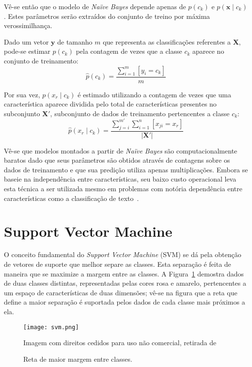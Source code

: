 Vê-se então que o modelo de \textit{Naïve Bayes} depende apenas de $p(c_k)$ e $p(\mathbf{x} \mid c_k)$.
Estes parâmetros serão extraídos do conjunto de treino por máxima verossimilhança.

Dado um vetor $\mathbf{y}$ de tamanho $m$ que representa as classificações referentes a $\mathbf{X}$, pode-se estimar
$p(c_k)$ pela contagem de vezes que a classe $c_k$ aparece no conjunto de treinamento:
\begin{equation}
    \hat{p}(c_k) = \frac{\sum_{i=1}^m [y_i = c_k]}{m}
\end{equation}

Por sua vez, $p(x_r \mid c_k)$ é estimado utilizando a contagem de vezes que uma característica aparece dividida pelo
total de características presentes no subconjunto $\mathbf{X'}$, subconjunto de dados de treinamento pertencentes a
classe $c_k$:
\begin{equation}
    \hat{p}(x_r \mid c_k) = \frac{\sum_{j=i}^{m'} \sum_{i=1}^n [x_{ji} = x_r]}{|\mathbf{X'}|}
\end{equation}

Vê-se que modelos montados a partir de \textit{Naïve Bayes} são computacionalmente baratos dado que seus parâmetros são
obtidos através de contagens sobre os dados de treinamento e que sua predição utiliza apenas multiplicações.
Embora se baseie na independência entre características, seu baixo custo operacional leva esta técnica a ser utilizada
mesmo em problemas com notória dependência entre características como a classificação de texto~\cite{mccallum98}.

\section{Support Vector Machine}

O conceito fundamental do \textit{Support Vector Machine} (SVM) se dá pela obtenção de vetores de suporte que melhor
separe as classes.
Esta separação é feita de maneira que se maximize a margem entre as classes.
A Figura~\ref{fig:svm} demostra dados de duas classes distintas, representadas pelas cores rosa e amarelo, pertencentes
a um espaço de características de duas dimensões; vê-se na figura que a reta que define a maior separação é suportada
pelos dados de cada classe mais próximos a ela.

\begin{figure}
\begin{center} {
    \begin{center}
    \texttt{[image: svm.png]}
    \caption{Reta de maior margem entre classes.}
    \small Imagem com direitos cedidos para uso não comercial, retirada de~\cite{vanderplas15}
    \label{fig:svm}
    \end{center}
}
\end{center}
\end{figure}

